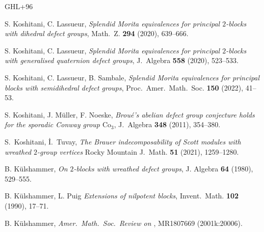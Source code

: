 \documentclass[12pt,a4paper]{amsart}
\theoremstyle{plain}\newtheorem{Theorem}{Theorem}[section]
\theoremstyle{plain}\newtheorem{Conjecture}[Theorem]{Conjecture}
\theoremstyle{plain}\newtheorem{Corollary}[Theorem]{Corollary}
\theoremstyle{plain}\newtheorem{Lemma}[Theorem]{Lemma}
\theoremstyle{plain}\newtheorem{Proposition}[Theorem]{Proposition}
\theoremstyle{definition}\newtheorem{Definition}[Theorem]{Definition}
\theoremstyle{definition}\newtheorem{Example}[Theorem]{Example}
\theoremstyle{definition}\newtheorem{Examples}[Theorem]{Examples}
\theoremstyle{definition}\newtheorem{Remark}[Theorem]{Remark}
\theoremstyle{definition}\newtheorem{Question}[Theorem]{Question}
\theoremstyle{definition}\newtheorem{Notation}[Theorem]{Notation}
\theoremstyle{definition}\newtheorem{Hypothesis}[Theorem]{Hypothesis}
\theoremstyle{definition}\newtheorem{Assumption}[Theorem]{Assumption}
\theoremstyle{definition}\newtheorem{Strategy}[Theorem]{Strategy}
\theoremstyle{definition}\newtheorem{Contents}[Theorem]{Contents}
\theoremstyle{definition}\newtheorem{Computations}[Theorem]{Computations}
\theoremstyle{definition}\newtheorem{Equivalences}[Theorem]{Equivalences}
\theoremstyle{definition}\newtheorem{Notation/Definition}[Theorem]{Notation/Definition}
\theoremstyle{definition}\newtheorem{noth}[Theorem]{}
\theoremstyle{plain}\newtheorem{Step}[Theorem]{Step}
\begin{document}
\begin{thebibliography}{GHL+96}


 {\sc S. Koshitani, C. Lassueur}, 
\emph{Splendid Morita equivalences for principal
$2$-blocks with dihedral defect groups}, 
Math.~Z. \textbf{294} (2020), 639--666.



 {\sc S. Koshitani, C. Lassueur}, 
\emph {Splendid Morita equivalences for principal $2$-blocks 
with generalised quaternion defect groups}, 
J.~Algebra \textbf{558} (2020), 523--533.

{\color{black}
 {\sc S. Koshitani, C. Lassueur, B. Sambale}, 
\emph{Splendid Morita equivalences for
principal blocks with semidihedral defect groups}, 
Proc.~Amer.~Math.~Soc. \textbf{150} (2022), 41--53.
}



 {\sc S. Koshitani, J. M{\"u}ller, F. Noeske}, 
\emph{Brou\'e's abelian defect group conjecture holds 
for the sporadic Conway group ${\mathrm{Co}}_3$}, 
J.~Algebra \textbf{348} (2011), 354--380.

 {\sc S.~Koshitani, \.I.~Tuvay}, 
\emph{ The Brauer indecomposability of Scott modules with
wreathed $2$-group vertices}
Rocky Mountain J.~Math. \textbf{51} (2021), 1259--1280.

{\sc B. K{\"u}lshammer},
 \textit{On $2$-blocks with wreathed defect groups}, J. Algebra
  \textbf{64} (1980), 529--555.


{\sc B. K{\"u}lshammer, L. Puig}
\textit{Extensions of nilpotent blocks}, Invent.~Math.
\textbf{102} (1990), 17--71.





{\sc B. K{\"u}lshammer},
\emph{Amer.~Math.~Soc.~Review on \cite{Pui01}}, 
MR1807669 (2001k:20006).





\end{thebibliography}
\end{document}
